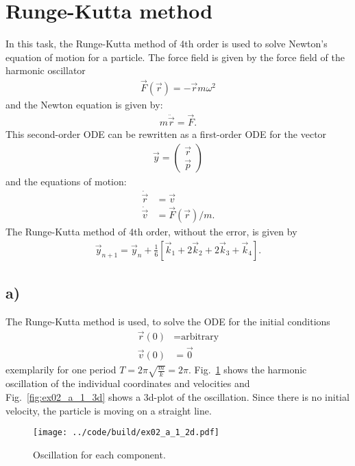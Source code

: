 \section{Runge-Kutta method}
In this task, the Runge-Kutta method of 4th order is used to solve Newton's equation of motion for a particle. The force field is given by the force field of the harmonic oscillator
\begin{align}
    \vec{F}\left( \vec{r} \right) = - \vec{r} m \omega^2
\end{align}
and the Newton equation is given by:
\begin{align}
   m \ddot{\vec{r}} = \vec{F}.
\end{align}
This second-order ODE can be rewritten as a first-order ODE for the vector
\begin{align}
    \vec{y} = \begin{pmatrix}
        \vec{r} \\
        \vec{p}
    \end{pmatrix}
\end{align} 
and the equations of motion:
\begin{align}
    \dot{\vec{r}} &= \vec{v} \\
    \dot{\vec{v}} &=  \vec{F}\left( \vec{r} \right) / m.
\end{align}
The Runge-Kutta method of 4th order, without the error, is given by
\begin{align}
    \vec{y}_{n+1} = \vec{y}_n + \frac{1}{6} \left[ \vec{k}_1 + 2\vec{k}_2 + 2\vec{k}_3 + \vec{k}_4 \right].
\end{align}

\subsection{a)}
The Runge-Kutta method is used, to solve the ODE for the initial conditions 
\begin{align}
    \vec{r}(0) &= \text{arbitrary} \\
    \vec{v}(0) &= \vec{0}
\end{align}
exemplarily for one period $T=2\pi \sqrt{\frac{m}{k}} = 2\pi$. Fig.~\ref{fig:ex02_1_2d} shows the harmonic oscillation of the individual coordinates and velocities and Fig.~\ref{fig:ex02_a_1_3d} shows a 3d-plot of the oscillation. Since there is no initial velocity, the particle is moving on a straight line.

\begin{figure}[H]
    \centering
    \texttt{[image: ../code/build/ex02\_a\_1\_2d.pdf]}
    \caption{Oscillation for each component.}
    \label{fig:ex02_1_2d}
\end{figure}

